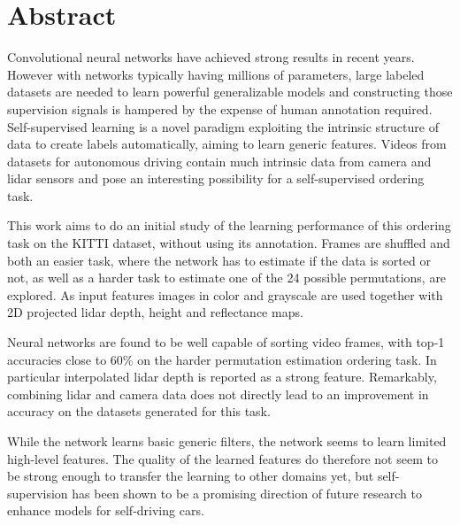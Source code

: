 %

\newpage
\vspace{3cm}

\chapter*{Abstract}
Convolutional neural networks have achieved strong results in recent years. However with networks typically having millions of parameters, large labeled datasets are needed to learn powerful generalizable models and constructing those supervision signals is hampered by the expense of human annotation required. Self-supervised learning is a novel paradigm exploiting the intrinsic structure of data to create labels automatically, aiming to learn generic features. Videos from datasets for autonomous driving contain much intrinsic data from camera and lidar sensors and pose an interesting possibility for a self-supervised ordering task. 

This work aims to do an initial study of the learning performance of this ordering task on the KITTI dataset, without using its annotation. Frames are shuffled and both an easier task, where the network has to estimate if the data is sorted or not, as well as a harder task to estimate one of the 24 possible permutations, are explored. As input features images in color and grayscale are used together with 2D projected lidar depth, height and reflectance maps.

Neural networks are found to be well capable of sorting video frames, with top-1 accuracies close to 60\% on the harder permutation estimation ordering task. In particular interpolated lidar depth is reported as a strong feature. Remarkably, combining lidar and camera data does not directly lead to an improvement in accuracy on the datasets generated for this task.

While the network learns basic generic filters, the network seems to learn limited high-level features. The quality of the learned features do therefore not seem to be strong enough to transfer the learning to other domains yet, but self-supervision has been shown to be a promising direction of future research to enhance models for self-driving cars.

